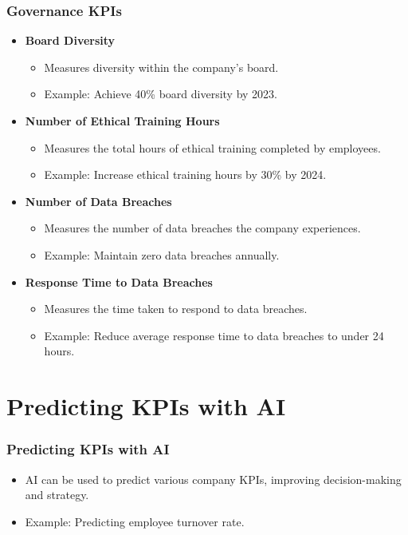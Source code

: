 \documentclass{beamer}
\begin{document}
\begin{frame}
\frametitle{Governance KPIs}
\begin{itemize}
    \item \textbf{Board Diversity}
        \begin{itemize}
            \item Measures diversity within the company's board.
            \item Example: Achieve 40\% board diversity by 2023.
        \end{itemize}
    \item \textbf{Number of Ethical Training Hours}
        \begin{itemize}
            \item Measures the total hours of ethical training completed by employees.
            \item Example: Increase ethical training hours by 30\% by 2024.
        \end{itemize}
    \item \textbf{Number of Data Breaches}
        \begin{itemize}
            \item Measures the number of data breaches the company experiences.
            \item Example: Maintain zero data breaches annually.
        \end{itemize}
    \item \textbf{Response Time to Data Breaches}
        \begin{itemize}
            \item Measures the time taken to respond to data breaches.
            \item Example: Reduce average response time to data breaches to under 24 hours.
        \end{itemize}
\end{itemize}
\end{frame}

\section{Predicting KPIs with AI}

\begin{frame}
\frametitle{Predicting KPIs with AI}
\begin{itemize}
    \item AI can be used to predict various company KPIs, improving decision-making and strategy.
    \item Example: Predicting employee turnover rate.
\end{itemize}
\end{frame}
\end{document}
